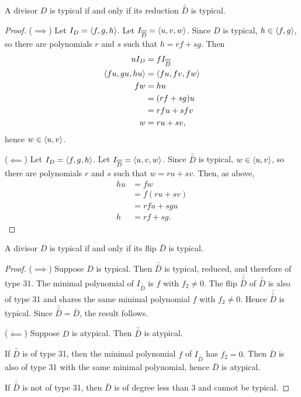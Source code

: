 \begin{theorem}
  A divisor $D$ is typical if and only if its reduction $\bar{\bar D}$ is typical.
\end{theorem}
\begin{proof}
  ($\implies$)
  Let $I_D = \left\langle f, g, h \right\rangle$.
  Let $I_{\overline{\overline D}} = \left\langle u, v, w \right\rangle$.
  Since $D$ is typical, $h \in \left\langle f, g \right\rangle$,
  so there are polynomials $r$ and $s$ such that $h = rf + sg$. Then
  \begin{align*}
    uI_D &= fI_{\overline{\overline D}} \\
    \left\langle fu, gu, hu \right\rangle &= \left\langle fu, fv, fw \right\rangle \\
    fw &= hu \\
       &= (rf + sg)u \\
       &= rfu + sfv \\
     w &= ru + sv,
  \end{align*}
  hence $w \in \left\langle u,v \right\rangle$.

  ($\impliedby$)
  Let $I_D = \left\langle f, g, h \right\rangle$.
  Let $I_{\overline{\overline D}} = \left\langle u, v, w \right\rangle$.
  Since $\bar{\bar D}$ is typical, $w \in \left\langle u, v \right\rangle$,
  so there are polynomials $r$ and $s$ such that $w = ru + sv$. Then, as above,
  \begin{align*}
    hu &= fw \\
       &= f(ru + sv) \\
       &= rfu + sgu \\
     h &= rf + sg.
  \end{align*}
\end{proof}

\begin{theorem}
  A divisor $D$ is typical if and only if its flip $\bar D$ is typical.
\end{theorem}
\begin{proof}
  ($\implies$)
  Suppose $D$ is typical.
  Then $\bar{\bar D}$ is typical, reduced, and therefore of type 31.
  The minimal polynomial of $I_{\bar{\bar D}}$ is $f$ with $f_2 \neq 0$.
  The flip $\bar{\bar{\bar D}}$ of $\bar{\bar D}$ is also of type 31
  and shares the same minimal polynomial $f$ with $f_2 \neq 0$.
  Hence $\bar{\bar{\bar D}}$ is typical.
  Since $\bar{\bar{\bar D}} = \bar D$, the result follows.

  ($\impliedby$)
  Suppose $D$ is atypical.
  Then $\bar{\bar D}$ is atypical.
  
  If $\bar{\bar D}$ is of type 31, then the minimal polynomial $f$ of $I_{\bar{\bar D}}$ has $f_2 = 0$.
  Then $\bar D$ is also of type 31 with the same minimal polynomial, hence $\bar D$ is atypical.
  
  If $\bar{\bar D}$ is not of type 31, then $\bar D$ is of degree less than 3 and cannot be typical.
\end{proof}



